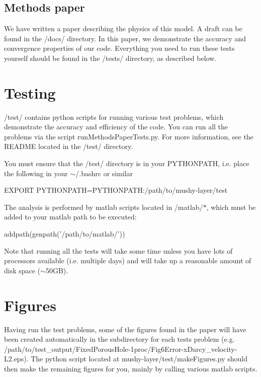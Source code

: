 \subsection*{Methods paper}

We have written a paper describing the physics of this model. A draft can be found in the {\ttfamily /docs/} directory. In this paper, we demonstrate the accuracy and convergence properties of our code. Everything you need to run these tests yourself should be found in the {\ttfamily /tests/} directory, as described below.

\section*{Testing}

{\ttfamily /test/} contains python scripts for running various test problems, which demonstrate the accuracy and efficiency of the code. You can run all the problems via the script {\ttfamily run\+Methods\+Paper\+Tests.\+py}. For more information, see the R\+E\+A\+D\+ME located in the {\ttfamily /test/} directory.

You must ensure that the {\ttfamily /test/} directory is in your {\ttfamily P\+Y\+T\+H\+O\+N\+P\+A\+TH}, i.\+e. place the following in your $\sim$/.bashrc or similar


\begin{DoxyCode}
EXPORT PYTHONPATH=PYTHONPATH:/path/to/mushy-layer/test
\end{DoxyCode}


The analysis is performed by matlab scripts located in {\ttfamily /matlab/$\ast$}, which must be added to your matlab path to be executed\+:


\begin{DoxyCode}
addpath(genpath('/path/to/matlab/'))
\end{DoxyCode}


Note that running all the tests will take some time unless you have lots of processors available (i.\+e. multiple days) and will take up a reasonable amount of disk space ($\sim$50\+GB).

\section*{Figures}

Having run the test problems, some of the figures found in the paper will have been created automatically in the subdirectory for each tests problem (e.\+g. {\ttfamily /path/to/test\+\_\+output/\+Fixed\+Porous\+Hole-\/1proc/\+Fig6\+Error-\/x\+Darcy\+\_\+velocity-\/\+L2.eps}). The python script located at {\ttfamily mushy-\/layer/test/make\+Figures.\+py} should then make the remaining figures for you, mainly by calling various matlab scripts.

